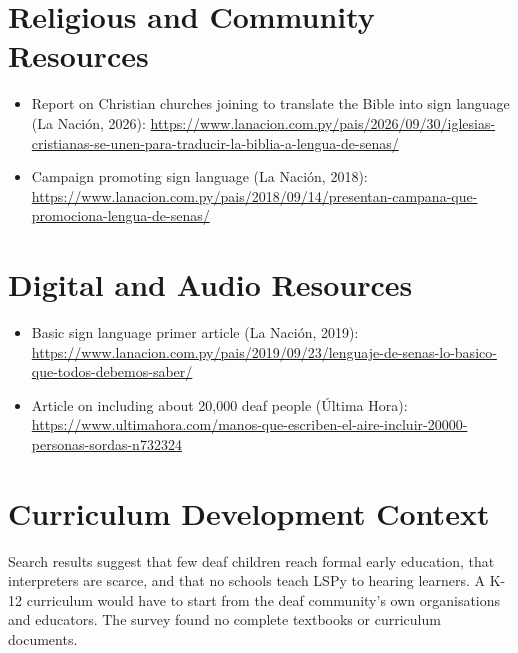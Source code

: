 \documentclass[12pt]{article}
\begin{document}
\section{Religious and Community Resources}
\begin{itemize}
\item Report on Christian churches joining to translate the Bible into sign language (La Naci\'on, 2026): \url{https://www.lanacion.com.py/pais/2026/09/30/iglesias-cristianas-se-unen-para-traducir-la-biblia-a-lengua-de-senas/}
\item Campaign promoting sign language (La Naci\'on, 2018): \url{https://www.lanacion.com.py/pais/2018/09/14/presentan-campana-que-promociona-lengua-de-senas/}
\end{itemize}

\section{Digital and Audio Resources}
\begin{itemize}
\item Basic sign language primer article (La Naci\'on, 2019): \url{https://www.lanacion.com.py/pais/2019/09/23/lenguaje-de-senas-lo-basico-que-todos-debemos-saber/}
\item Article on including about 20,000 deaf people (\'Ultima Hora): \url{https://www.ultimahora.com/manos-que-escriben-el-aire-incluir-20000-personas-sordas-n732324}
\end{itemize}

\section{Curriculum Development Context}
Search results suggest that few deaf children reach formal early education, that interpreters are scarce, and that no schools teach LSPy to hearing learners. A K-12 curriculum would have to start from the deaf community's own organisations and educators. The survey found no complete textbooks or curriculum documents.
\end{document}
